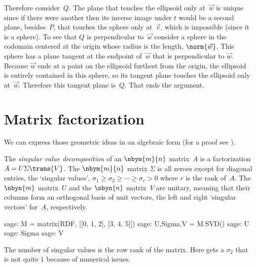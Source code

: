 Therefore consider~$Q$.
The plane that touches the ellipsoid
only at~$\vec{w}$ is unique since if there were another then its inverse image
under $t$
would be a second plane, besides~$P$, 
that touches the sphere only at~$\vec{v}$, which is impossible (since it is a
sphere).
To see that $Q$ is perpendicular to~$\vec{w}$ consider a sphere in the codomain
centered at the origin whose radius is the length, $\norm{\vec{w}}$.
This sphere has a plane tangent at the endpoint of~$\vec{w}$ 
that is perpendicular
to $\vec{w}$.
Because $\vec{w}$ ends at a point on the ellipsoid furthest from the origin,
the ellipsoid is entirely contained in this sphere, so its tangent plane 
touches the ellipsoid only at~$\vec{w}$.
Therefore
this tangent plane is~$Q$. 
That ends the argument.



\section{Matrix factorization}

We can express those geometric ideas in an algebraic form
(for a proof see \cite{TrefethenBau97}).

The \textit{singular value decomposition} of an $\nbym{m}{n}$ matrix~$A$
is a factorization $A=U\Sigma \trans{V}$.
The $\nbym{m}{n}$ matrix $\Sigma$ 
is all zeroes except for diagonal entries, the `singular values', 
$\sigma_1\geq \sigma_2 \geq \cdots \geq \sigma_r> 0$ where $r$ is the
rank of~$A$.
The $\nbyn{m}$ matrix~$U$ and the $\nbyn{n}$ matrix~$V$ are unitary, meaning
that their columns form an orthogonal basis of unit vectors, the left and 
right `singular vectors' for~$A$, respectively. 
\begin{sagecommandline}
sage: M = matrix(RDF, [[0, 1, 2], [3, 4, 5]])
sage: U,Sigma,V = M.SVD()
sage: U
sage: Sigma
sage: V  
\end{sagecommandline}
The number of singular values is the row rank of the matrix.
Here \Sage{} gets a $\sigma_2$ that is not quite \( 1 \) because of numerical 
issues. 

